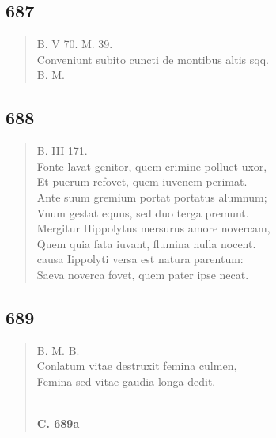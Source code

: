 \documentclass[11pt, a4paper]{report}
\begin{document}
            \subsection*{687}
      \begin{verse}
      B. V 70. M. 39. \\ Conveniunt subito cuncti de montibus altis sqq. \\ B. M. \\ 
      \end{verse}
  
            \subsection*{688}
      \begin{verse}
      B. III 171. \\ Fonte lavat genitor, quem crimine polluet uxor, \\ Et puerum refovet, quem iuvenem perimat. \\ Ante suum gremium portat portatus alumnum; \\ Vnum gestat equus, sed duo terga premunt. \\ Mergitur Hippolytus mersurus amore novercam, \\ Quem quia fata iuvant, flumina nulla nocent. \\ causa Iippolyti versa est natura parentum: \\ Saeva noverca fovet, quem pater ipse necat. \\ 
      \end{verse}
  
            \subsection*{689}
      \begin{verse}
      B. M. B. \\ Conlatum vitae destruxit femina culmen, \\ Femina sed vitae gaudia longa dedit. \\ 
        ﻿\pagebreak 
    \begin{center} \textbf{C. 689a} \end{center} \marginpar{[162]} 
      \end{verse}
  
\end{document}
